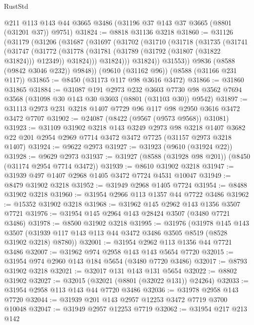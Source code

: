 \begin{lexlean}{RustStd}
\begin{coremodule}
    @211
    @113
    @143
    @44
    @3665
    @3486
    (@31196 @37 @143 @37 @3665 (@8801 (@31201 @37)) @9751)
@31824 := @8818 @31136 @3218
@31860 := @31126
    (@31179
      (@31206
        (@31687
          (@31697
            (@31702
              (@31710
                (@31718
                  (@31735
                    (@31741
                      (@31747
                        (@31772
                          (@31778
                            (@31781 (@31789 (@31792 (@31807 (@31822 @31824))) @12349))
                            @31824)))
                      @31824)))
                @31824))
            @31553))
        @9836
        (@8588 (@9842 @3046 @232))
        @9848))
    (@9610 (@31162 @96))
    (@8588 (@31166 @231 @117))
@31865 := @8450 (@31173 @117 @98 @3616 @3472)
@31866 := @31860 @31865
@31884 := @31087
    @191
    @2973
    @232
    @3603
    @7730
    @98
    @3562
    @7694
    @3568
    (@31098 @30 @143 @30 @3603 (@8801 (@31103 @30)) @9542)
@31897 := @31113 @2973 @231 @3218 @1407 @7729 @96 @117 @98 @2950 @3616 @3472 @3472 @7707
@31902 := @24087 (@8422 (@9567 (@9573 @9568)) @31081)
@31923 := @31109
    @31902
    @3218
    @143
    @3249
    @2973
    @98
    @3218
    @1407
    @3682
    @22
    @201
    @2954
    @2969
    @7714
    @3472
    @3472
    @7725
    (@31157 @2973 @3218 @1407)
@31924 := @9622 @2973
@31927 := @31923 (@9610 (@31924 @22))
@31928 := @9629 @2973
@31937 := @31927 (@8588 (@31928 @98 @201)) (@8450 (@31174 @2954 @7714 @3472))
@31939 := @8610 @31902 @3218
@31947 := @31939 @497 @1407 @2968 @1405 @3472 @7724 @4531 @10047
@31949 := @8479 @31902 @3218
@31952 := @31949 @2968 @1405 @7724
@31954 := @8488 @31902 @3218
@31960 := @31954 @2966 @113 @1357 @44 @7722 @3486
@31962 := @15352 @31902 @3218
@31968 := @31962 @145 @2962 @143 @1356 @3507 @7721
@31976 := @31954 @145 @2964 @143 @28424 @3507 (@3480 @7721 @3486)
@31978 := @8500 @31902 @3218
@31995 := @31976
    (@31978
      @145
      @143
      @3507
      (@31939 @117 @143 @113 @44 @3472 @3486 @3505 @8519 (@8528 @31902 @3218) @8780))
@32001 := @31954 @2962 @113 @1356 @44 @7721 @3486
@32007 := @31962 @974 @2958 @143 @143 @5654 @7720
@32015 := @31954 @974 @2960 @143 @184 @5654 (@3480 @7720 @3486)
@32017 := @8793 @31902 @3218
@32021 := @32017 @131 @143 @131 @5654
@32022 := @8802 @31902
@32027 := @32015 (@32021 (@8801 (@32022 @131)) @24264)
@32033 := @31954 @2958 @113 @143 @44 @7720 @3486
@32036 := @31978 @2958 @143 @7720
@32044 := @31939 @201 @143 @2957 @12253 @3472 @7719 @3700 @10048
@32047 := @31949 @2957 @12253 @7719
@32062 := @31954
    @217
    @213
    @142

\end{coremodule}
\end{lexlean}
